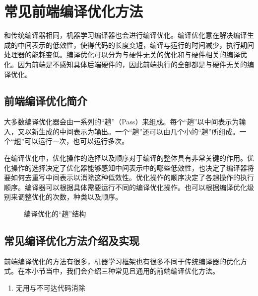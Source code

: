 \documentclass[letterpaper,10pt,english]{sphinxmanual}
\let\sphinxpxdimen\pdfpxdimen\else\newdimen\sphinxpxdimen
\begin{document}
\section{常见前端编译优化方法}
\label{\detokenize{chapter_frontend_and_ir/common_frontend_optimization_pass:id1}}\label{\detokenize{chapter_frontend_and_ir/common_frontend_optimization_pass::doc}}
\sphinxAtStartPar
和传统编译器相同，机器学习编译器也会进行编译优化。编译优化意在解决编译生成的中间表示的低效性，使得代码的长度变短，编译与运行的时间减少，执行期间处理器的能耗变低。编译优化可以分为与硬件无关的优化和与硬件相关的编译优化。因为前端是不感知具体后端硬件的，因此前端执行的全部都是与硬件无关的编译优化。


\subsection{前端编译优化简介}
\label{\detokenize{chapter_frontend_and_ir/common_frontend_optimization_pass:id2}}
\sphinxAtStartPar
大多数编译优化器会由一系列的“趟”（Pass）来组成。每个“趟”以中间表示为输入，又以新生成的中间表示为输出。一个“趟”还可以由几个小的“趟”所组成。一个“趟”可以运行一次，也可以运行多次。

\sphinxAtStartPar
在编译优化中，优化操作的选择以及顺序对于编译的整体具有非常关键的作用。优化操作的选择决定了优化器能够感知中间表示中的哪些低效性，也决定了编译器将要如何去重写中间表示以消除这种低效性。优化操作的顺序决定了各趟操作的执行顺序。编译器可以根据具体需要运行不同的编译优化操作。也可以根据编译优化级别来调整优化的次数，种类以及顺序。

\begin{figure}[H]
\centering
\capstart

\noindent\sphinxincludegraphics[width=800\sphinxpxdimen]{{编译优化-pass结构}.svg}
\caption{编译优化的“趟”结构}\label{\detokenize{chapter_frontend_and_ir/common_frontend_optimization_pass:id4}}\label{\detokenize{chapter_frontend_and_ir/common_frontend_optimization_pass:pass-structure}}\end{figure}


\subsection{常见编译优化方法介绍及实现}
\label{\detokenize{chapter_frontend_and_ir/common_frontend_optimization_pass:id3}}
\sphinxAtStartPar
前端编译优化的方法有很多，机器学习框架也有很多不同于传统编译器的优化方式。在本小节当中，我们会介绍三种常见且通用的前端编译优化方法。
\begin{enumerate}
%
\item {} 
\sphinxAtStartPar
无用与不可达代码消除

\end{enumerate}
\end{document}
